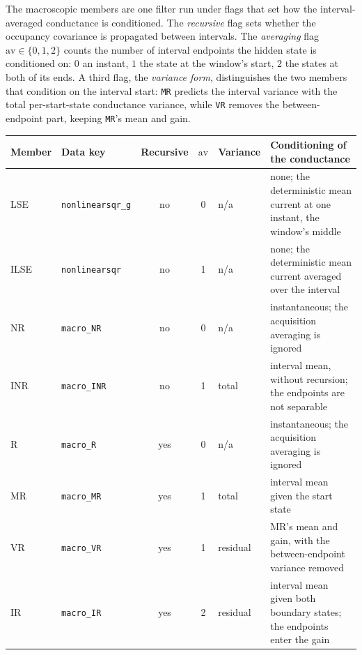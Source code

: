 \documentclass[11pt]{article}
\begin{document}
The macroscopic members are one filter run under flags that set how the interval-averaged
conductance is conditioned. The \emph{recursive} flag sets whether the occupancy covariance is
propagated between intervals. The \emph{averaging} flag $\mathrm{av}\in\{0,1,2\}$ counts the number
of interval endpoints the hidden state is conditioned on: $0$ an instant, $1$ the state at the
window's start, $2$ the states at both of its ends. A third flag, the \emph{variance form},
distinguishes the two members that condition on the interval start: \texttt{MR} predicts the
interval variance with the total per-start-state conductance variance, while \texttt{VR} removes the
between-endpoint part, keeping \texttt{MR}'s mean and gain.

\begin{center}
\small
\begin{tabularx}{\linewidth}{@{}llccl>{\raggedright\arraybackslash}X@{}}
\toprule
Member & Data key & Recursive & $\mathrm{av}$ & Variance & Conditioning of the conductance \\
\midrule
LSE & \texttt{nonlinearsqr\_g} & no & 0 & n/a      & none; the deterministic mean current at one instant, the window's middle \\
ILSE & \texttt{nonlinearsqr} & no  & 1 & n/a      & none; the deterministic mean current averaged over the interval \\
NR  & \texttt{macro\_NR}    & no  & 0 & n/a      & instantaneous; the acquisition averaging is ignored \\
INR & \texttt{macro\_INR}   & no  & 1 & total    & interval mean, without recursion; the endpoints are not separable \\
R   & \texttt{macro\_R}     & yes & 0 & n/a      & instantaneous; the acquisition averaging is ignored \\
MR  & \texttt{macro\_MR}    & yes & 1 & total    & interval mean given the start state \\
VR  & \texttt{macro\_VR}    & yes & 1 & residual & MR's mean and gain, with the between-endpoint variance removed \\
IR  & \texttt{macro\_IR}    & yes & 2 & residual & interval mean given both boundary states; the endpoints enter the gain \\
\bottomrule
\end{tabularx}
\end{center}
\end{document}
